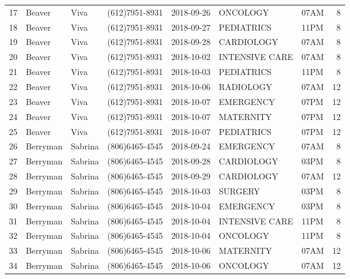\documentclass[11pt]{article}
\begin{document}
\begin{tabular}{lllllllr}
	17 &     Beaver &     Viva &  (612)7951-8931 &  2018-09-26 &        ONCOLOGY &  07AM &             8 \\
	18 &     Beaver &     Viva &  (612)7951-8931 &  2018-09-27 &      PEDIATRICS &  11PM &             8 \\
	19 &     Beaver &     Viva &  (612)7951-8931 &  2018-09-28 &      CARDIOLOGY &  07AM &             8 \\
	20 &     Beaver &     Viva &  (612)7951-8931 &  2018-10-02 &  INTENSIVE CARE &  07AM &             8 \\
	21 &     Beaver &     Viva &  (612)7951-8931 &  2018-10-03 &      PEDIATRICS &  11PM &             8 \\
	22 &     Beaver &     Viva &  (612)7951-8931 &  2018-10-06 &       RADIOLOGY &  07AM &            12 \\
	23 &     Beaver &     Viva &  (612)7951-8931 &  2018-10-07 &       EMERGENCY &  07PM &            12 \\
	24 &     Beaver &     Viva &  (612)7951-8931 &  2018-10-07 &       MATERNITY &  07PM &            12 \\
	25 &     Beaver &     Viva &  (612)7951-8931 &  2018-10-07 &      PEDIATRICS &  07PM &            12 \\
	26 &   Berryman &  Sabrina &  (806)6465-4545 &  2018-09-24 &       EMERGENCY &  07AM &             8 \\
	27 &   Berryman &  Sabrina &  (806)6465-4545 &  2018-09-28 &      CARDIOLOGY &  03PM &             8 \\
	28 &   Berryman &  Sabrina &  (806)6465-4545 &  2018-09-29 &      CARDIOLOGY &  07AM &            12 \\
	29 &   Berryman &  Sabrina &  (806)6465-4545 &  2018-10-03 &         SURGERY &  03PM &             8 \\
	30 &   Berryman &  Sabrina &  (806)6465-4545 &  2018-10-04 &       EMERGENCY &  03PM &             8 \\
	31 &   Berryman &  Sabrina &  (806)6465-4545 &  2018-10-04 &  INTENSIVE CARE &  11PM &             8 \\
	32 &   Berryman &  Sabrina &  (806)6465-4545 &  2018-10-04 &        ONCOLOGY &  11PM &             8 \\
	33 &   Berryman &  Sabrina &  (806)6465-4545 &  2018-10-06 &       MATERNITY &  07AM &            12 \\
	34 &   Berryman &  Sabrina &  (806)6465-4545 &  2018-10-06 &        ONCOLOGY &  07AM &            12 \\

\end{tabular}
\end{document}
